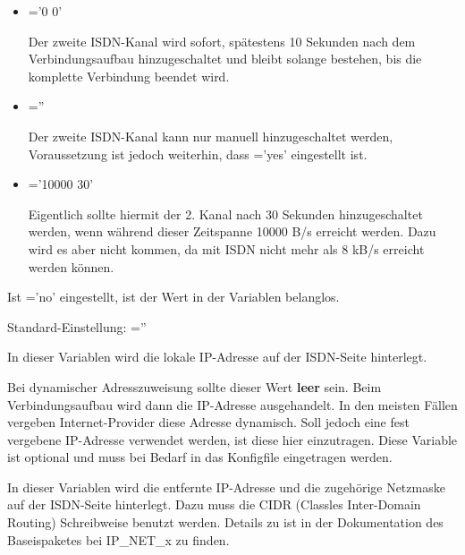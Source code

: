 \begin{description}
\begin{itemize}
  \item {}='0 0'
    
    Der zweite ISDN-Kanal wird sofort, spätestens 10 Sekunden nach dem
    Verbindungsaufbau hinzugeschaltet und bleibt solange bestehen, bis
    die komplette Verbindung beendet wird.
    
  \item {}=''
    
    Der zweite ISDN-Kanal kann nur manuell hinzugeschaltet werden,
    Voraussetzung ist jedoch weiterhin, dass
    ='yes' eingestellt ist.
    
  \item {}='10000 30'
    
    Eigentlich sollte hiermit der 2. Kanal nach 30 Sekunden
    hinzugeschaltet werden, wenn während dieser Zeitspanne 10000
    B/s erreicht werden. Dazu wird es aber nicht kommen, da mit
    ISDN nicht mehr als 8 kB/s erreicht werden können.

  \end{itemize}
  
  Ist ='no' eingestellt, ist der Wert in der
  Variablen \linebreak {} belanglos.
  
  Standard-Einstellung: =''


    
  In dieser Variablen wird die lokale IP-Adresse auf
  der ISDN-Seite hinterlegt.
  
  Bei dynamischer Adress\-zu\-wei\-sung sollte
  dieser Wert \textbf{leer} sein. Beim Verbindungsaufbau wird dann die
  IP-Adresse ausgehandelt. In den meisten Fällen vergeben Internet-Provider
  diese Adresse
  dynamisch. Soll jedoch eine fest vergebene IP-Adresse verwendet
  werden, ist diese hier einzutragen. Diese Variable ist optional
  und muss bei Bedarf in das Konfigfile eingetragen werden.

    
  In dieser Variablen wird die entfernte IP-Adresse und die zugehörige
  Netzmaske auf der ISDN-Seite hinterlegt. Dazu muss die CIDR
  (Classles Inter-Domain Routing)
  Schreibweise benutzt werden. Details zu  ist in
  der Dokumentation des Baseispaketes bei IP\_NET\_x zu finden.
  

\end{description}
